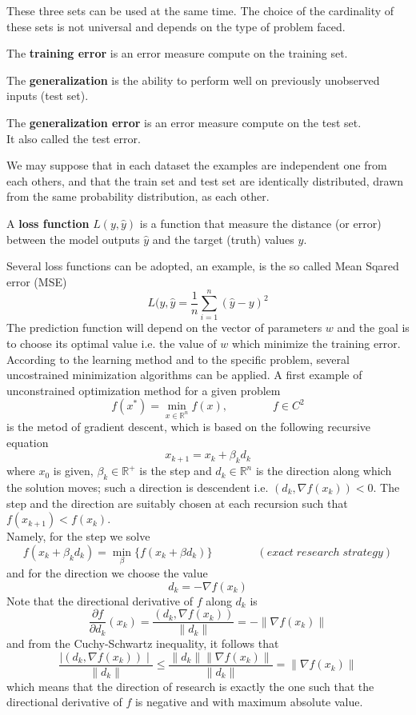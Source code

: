 \documentclass[a4paper,12pt]{report}
\begin{document}
These three sets can be used at the same time. The choice of the cardinality of these sets is not universal and depends on the type of problem faced.
\begin{defin}
The \textbf{training error} is an error measure compute on the training set.
\end{defin}
\begin{defin}
The \textbf{generalization} is the ability to perform well on previously unobserved inputs (test set).
\end{defin}
\begin{defin}
The \textbf{generalization error} is  an error measure compute on the test set.\\It also called the test error.
\end{defin}
We may suppose that in each dataset the examples are independent one from each others, and that the train set and test set are identically distributed, drawn from the same probability distribution, as each other.
\begin{defin}
A \textbf{loss function} $L(y,\hat{y})$ is a function that measure the distance (or error) between the model outputs $\hat{y}$ and the target (truth) values $y$.
\end{defin}
Several loss functions can be adopted, an example, is the so called Mean Sqared error (MSE)
$$L(y,\hat{y}=\frac{1}{n}\sum_{i=1}^{n}(\hat{y}-y)^2$$
The prediction function will depend on the vector of parameters $w$ and the goal is to choose its optimal value i.e. the value of $w$ which minimize the training error. 
According to the learning method and to the specific problem, several uncostrained minimization algorithms can be applied. A first example of unconstrained optimization method for a given problem 
$$f(x^{*})=\min_{x\in \mathbb{R}^{n}}f(x), \qquad \qquad f\in C^{2}$$
is the metod of gradient descent, which is based on the following recursive equation
\begin{equation} \label{eq:min}
x_{k+1}=x_{k}+\beta_{k}d_{k}
\end{equation}
where $x_{0}$ is given, $\beta_{k}\in \mathbb{R^{+}}$ is the step and $d_{k}\in \mathbb{R}^{n}$ is the direction along which the solution moves; such a direction is descendent i.e. $(d_{k},\nabla f(x_{k}))<0$. The step and the direction are suitably chosen at each recursion such that $f(x_{k+1})<f(x_{k})$.\\
Namely, for the step we solve
$$f(x_{k}+\beta_{k}d_{k})=\min_{\beta}\{f(x_{k}+\beta d_{k})\}\qquad \qquad (exact\; research \;strategy)$$
and for the direction we choose the value $$d_{k}=-\nabla f(x_{k})$$ Note that the directional derivative of $f$ along $d_{k}$ is $$\frac{\partial f}{\partial d_{k}}(x_{k})=\frac{(d_{k},\nabla f(x_{k}))}{\parallel d_{k}\parallel}=-\parallel \nabla f(x_{k})\parallel$$ and from the Cuchy-Schwartz inequality, it follows that $$\frac{\mid (d_{k},\nabla f(x_{k}))\mid}{\parallel d_{k}\parallel}\leq \frac{\parallel d_{k} \parallel \parallel \nabla f(x_{k})\parallel}{\parallel d_{k}\parallel}=\parallel \nabla f(x_{k})\parallel$$ which means that the direction of research is exactly the one such that the directional derivative of $f$ is negative and with maximum absolute value.\\
\end{document}
